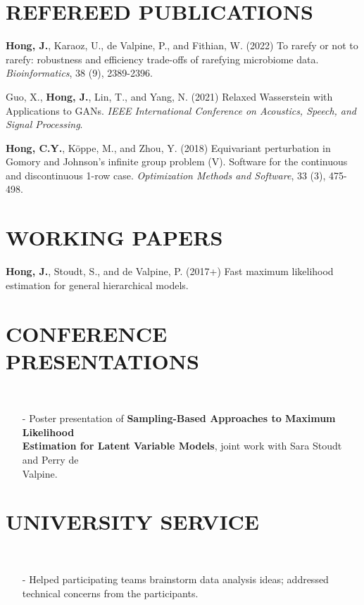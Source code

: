 \documentclass{res}
\begin{document}
\begin{resume}
\section{REFEREED PUBLICATIONS}
\textbf{Hong, J.}, Karaoz, U., de Valpine, P., and Fithian, W. (2022) To rarefy or not to rarefy: robustness and efficiency trade-offs of rarefying microbiome data. \textit{Bioinformatics}, 38 (9), 2389-2396.

Guo, X., \textbf{Hong, J.}, Lin, T., and Yang, N. (2021) Relaxed Wasserstein with Applications to GANs. \textit{IEEE International Conference on Acoustics, Speech, and Signal Processing}.

\textbf{Hong, C.Y.}, K\"{o}ppe, M., and Zhou, Y. (2018) Equivariant perturbation in Gomory and Johnson's infinite group problem (V). Software for the continuous and discontinuous 1-row case. \textit{Optimization Methods and Software}, 33 (3), 475-498.

\section{WORKING PAPERS}
\textbf{Hong, J.}, Stoudt, S., and de Valpine, P. (2017+) Fast maximum likelihood estimation for general hierarchical models.

\section{CONFERENCE PRESENTATIONS}
  \\ 
    \begin{itemize}\setlength\itemsep{0em}
    \item[-] Poster presentation of \textbf{Sampling-Based Approaches to Maximum Likelihood \\Estimation for Latent Variable Models}, joint work with Sara Stoudt and Perry de \\Valpine.
    \end{itemize}

\section{UNIVERSITY SERVICE}   
  \\ 
    \begin{itemize}\setlength\itemsep{0em}
    \item[-] Helped participating teams brainstorm data analysis ideas; addressed technical concerns from the participants.
    \end{itemize}


\end{resume}
\end{document}
